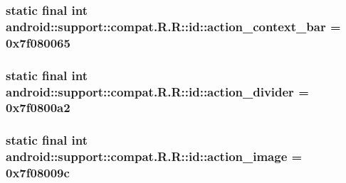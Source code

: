 \hypertarget{classandroid_1_1support_1_1compat_1_1_r_1_1id_83481e87569048ece81f5e44c604ffab}{
\subsubsection[{action\_\-context\_\-bar}]{\setlength{\rightskip}{0pt plus 5cm}static final int android::support::compat.R.R::id::action\_\-context\_\-bar = 0x7f080065}}
\label{classandroid_1_1support_1_1compat_1_1_r_1_1id_83481e87569048ece81f5e44c604ffab}


\hypertarget{classandroid_1_1support_1_1compat_1_1_r_1_1id_bfc02290a47192942d84be77edf6af4b}{
\subsubsection[{action\_\-divider}]{\setlength{\rightskip}{0pt plus 5cm}static final int android::support::compat.R.R::id::action\_\-divider = 0x7f0800a2}}
\label{classandroid_1_1support_1_1compat_1_1_r_1_1id_bfc02290a47192942d84be77edf6af4b}


\hypertarget{classandroid_1_1support_1_1compat_1_1_r_1_1id_5dfd5cfd5adcc4172dc7018460d2e501}{
\subsubsection[{action\_\-image}]{\setlength{\rightskip}{0pt plus 5cm}static final int android::support::compat.R.R::id::action\_\-image = 0x7f08009c}}
\label{classandroid_1_1support_1_1compat_1_1_r_1_1id_5dfd5cfd5adcc4172dc7018460d2e501}


